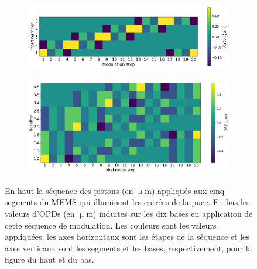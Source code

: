 \begin{figure}[ht!]
    \centering
    \begin{subfigure}{0.8\textwidth}
        \centering
        \includegraphics[width=\textwidth]{Figure_Chap3/20210503_MEMSModulationSequence_Standard_step20.png}
    \end{subfigure}
    \begin{subfigure}{0.8\textwidth}
        \centering
        \includegraphics[width=\textwidth]{Figure_Chap3/20210503_MEMSModulationSequence_Standard_step20_DiffBase.png}
    \end{subfigure}
    \caption[Séquence basique de modulation des MEMS à 20 pas pour échantillonner les franges sur FIRSTv2.]{En haut la séquence des pistons (en $\upmu$m) appliqués aux cinq segments du MEMS qui illuminent les entrées de la puce. En bas les valeurs d'OPDs (en $\upmu$m) induites sur les dix bases en application de cette séquence de modulation. Les couleurs sont les valeurs appliquées, les axes horizontaux sont les étapes de la séquence et les axes verticaux sont les segments et les bases, respectivement, pour la figure du haut et du bas.}
    \label{fig:ModSeq20}
\end{figure}

